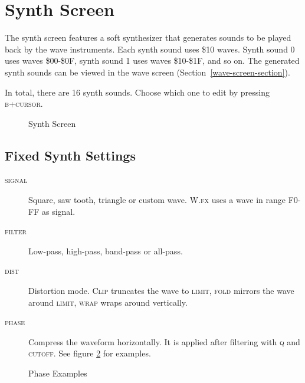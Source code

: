 \section{Synth Screen}

The synth screen features a soft synthesizer that generates sounds to be played back by the wave instruments.
Each synth sound uses \$10 waves. Synth sound 0 uses waves \$00-\$0F, synth sound 1 uses waves \$10-\$1F, and so on. The generated synth sounds can be viewed in the wave screen (Section~\ref{wave-screen-section}).

In total, there are 16 synth sounds. Choose which one to edit by pressing \textsc{b+cursor}.

\begin{figure}[htbp]
	\begin{center}
	\end{center}
	\caption{Synth Screen}
	\label{fig:synth}
\end{figure}

\subsection{Fixed Synth Settings}

\begin{description}
	\item[\textsc{signal}] Square, saw tooth, triangle or custom wave. \textsc{W.fx} uses a wave in range F0-FF as signal.
\item[\textsc{filter}] Low-pass, high-pass, band-pass or all-pass.
\item[\textsc{dist}] Distortion mode. \textsc{Clip} truncates the wave to \textsc{limit}, \textsc{fold} mirrors the wave around \textsc{limit}, \textsc{wrap} wraps around vertically.
\item[\textsc{phase}] \label{phase}
Compress the waveform horizontally. It is applied after filtering with \textsc{q} and \textsc{cutoff}. See figure \ref{fig:phasing} for examples.
\end{description}

\begin{figure}[hbtp]
	\centering
	\qquad

	\qquad
	\caption{Phase Examples}
	\label{fig:phasing}
\end{figure}

